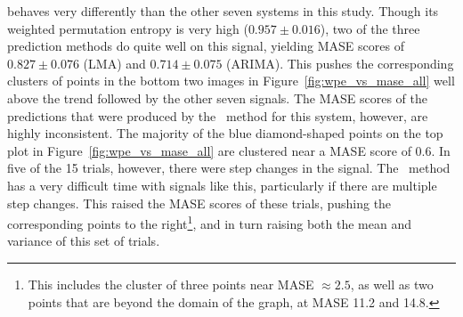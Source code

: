 \svdone behaves very differently than the other seven systems in this
study.  Though its weighted permutation entropy is very high ($0.957
\pm 0.016$), two of the three prediction methods do quite well on this
signal, yielding MASE scores of $0.827 \pm 0.076$ (LMA) and $0.714 \pm
0.075$ (ARIMA).  This pushes the corresponding clusters of points in
the bottom two images in Figure~\ref{fig:wpe_vs_mase_all} well above
the trend followed by the other seven signals.  The MASE scores of the
predictions that were produced by the \naive ~method for this system,
however, are highly inconsistent.  The majority of the blue
diamond-shaped points on the top plot in
Figure~\ref{fig:wpe_vs_mase_all} are clustered near a MASE score of
0.6.  In five of the 15 \svdone trials, however, there were step
changes in the signal.  The \naive ~method has a very difficult time
with signals like this, particularly if there are multiple step
changes.  This raised the MASE scores of these trials, pushing the
corresponding points to the right\footnote{This includes the cluster
  of three points near MASE $\approx 2.5$, as well as two points that
  are beyond the domain of the graph, at MASE 11.2 and 14.8.}, and in
turn raising both the mean and variance of this set of trials.

